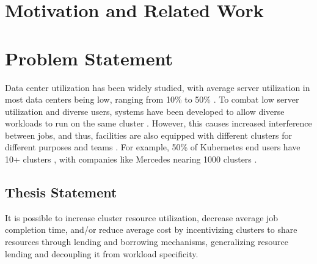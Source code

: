 \section{Motivation and Related Work}
\section{Problem Statement}
Data center utilization has been widely studied, with average server utilization in most data centers being low, 
ranging from 10\% to 50\%
\cite{lo_heracles_2015}. 
To combat low server utilization and diverse users, systems have been developed to allow diverse workloads to run 
on the same cluster \cite{bhattacharya_hierarchical_2013, hindman_mesos_nodate}. 
However, this causes increased interference between jobs, and thus, 
facilities are also equipped with different clusters for different purposes and teams \cite{patel_what_2022, li_lyra_2023}. 
For example, 50\% of Kubernetes \cite{verma_large-scale_2015}
end users have 10+ clusters \cite{noauthor_cncf_2023} 
, with companies like Mercedes nearing 1000 clusters \cite{noauthor_mercedes-benz_2023}.


\subsection{Thesis Statement}
It is possible to increase cluster resource utilization, decrease average job completion time, and/or reduce average cost by incentivizing clusters
to share resources through lending and borrowing mechanisms, generalizing resource lending and decoupling it from workload specificity.